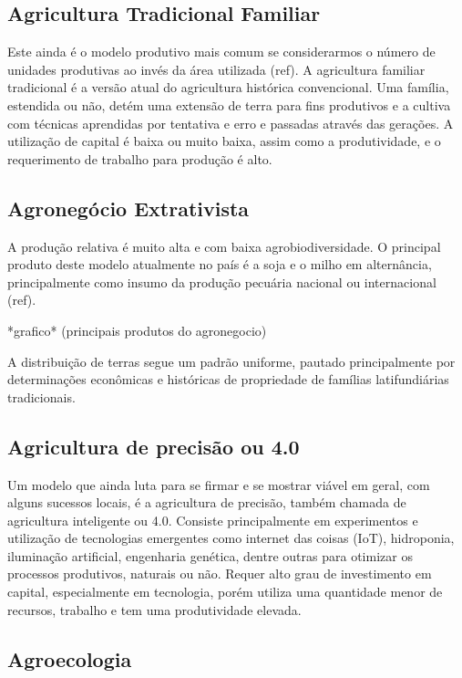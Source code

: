 \documentclass[]{article}
\begin{document}
\subsection{Agricultura Tradicional Familiar}

Este ainda é o modelo produtivo mais comum se considerarmos o número de unidades produtivas ao invés da área utilizada (ref). A agricultura familiar tradicional é a versão atual do agricultura histórica convencional. Uma família, estendida ou não, detém uma extensão de terra para fins produtivos e a cultiva com técnicas aprendidas por tentativa e erro e passadas através das gerações. A utilização de capital é baixa ou muito baixa, assim como a produtividade, e o requerimento de trabalho para produção é alto. 



\subsection{Agronegócio Extrativista}

A produção relativa é muito alta e com baixa agrobiodiversidade. O principal produto deste modelo atualmente no país é a soja e o milho em alternância, principalmente como insumo da produção pecuária nacional ou internacional (ref). 

*grafico* (principais produtos do agronegocio) 

A distribuição de terras segue um padrão uniforme, pautado principalmente por determinações econômicas e históricas de propriedade de famílias latifundiárias tradicionais. 


\subsection{Agricultura de precisão ou 4.0}

Um modelo que ainda luta para se firmar e se mostrar viável em geral, com alguns sucessos locais, é a agricultura de precisão, também chamada de agricultura inteligente ou 4.0. Consiste principalmente em experimentos e utilização de tecnologias emergentes como internet das coisas (IoT), hidroponia, iluminação artificial, engenharia genética, dentre outras para otimizar os processos produtivos, naturais ou não. Requer alto grau de investimento em capital, especialmente em tecnologia, porém utiliza uma quantidade menor de recursos, trabalho e tem uma produtividade elevada. 


\subsection{Agroecologia}
\end{document}
